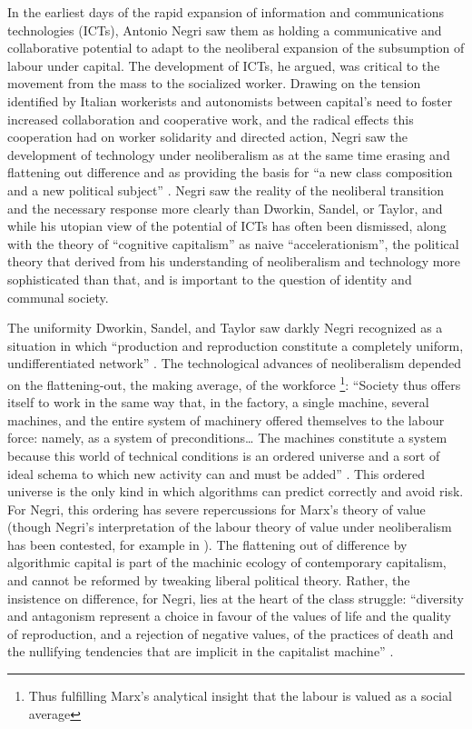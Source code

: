 \documentclass[12pt,oneside]{memoir}
\begin{document}
In the earliest days of the rapid expansion of information and communications technologies (ICTs), Antonio Negri saw them as holding a communicative and collaborative potential to adapt to the neoliberal expansion of the subsumption of labour under capital. The development of ICTs, he argued, was critical to the movement from the mass to the socialized worker. Drawing on the tension identified by Italian workerists and autonomists between capital's need to foster increased collaboration and cooperative work, and the radical effects this cooperation had on worker solidarity and directed action, Negri saw the development of technology under neoliberalism as at the same time erasing and flattening out difference and as providing the basis for ``a new class composition and a new political subject'' \citep[48]{Negri1989}. Negri saw the reality of the neoliberal transition and the necessary response more clearly than Dworkin, Sandel, or Taylor, and while his utopian view of the potential of ICTs has often been dismissed, along with the theory of ``cognitive capitalism'' as naive ``accelerationism'', the political theory that derived from his understanding of neoliberalism and technology more sophisticated than that, and is important to the question of identity and communal society. 
	
The uniformity Dworkin, Sandel, and Taylor saw darkly Negri recognized as a situation in which ``production and reproduction constitute a completely uniform, undifferentiated network'' \citep[89]{Negri1989}. The technological advances of neoliberalism depended on the flattening-out, the making average, of the workforce \footnote{Thus fulfilling Marx's analytical insight that the labour is valued as a social average}: ``Society thus offers itself to work in the same way that, in the factory, a single machine, several machines, and the entire system of machinery offered themselves to the labour force: namely, as a system of preconditions{\ldots} The machines constitute a system because this world of technical conditions is an ordered universe and a sort of ideal schema to which new activity can and must be added'' \citep[90]{Negri1989}. This ordered universe is the only kind in which algorithms can predict correctly and avoid risk. For Negri, this ordering has severe repercussions for Marx's theory of value (though Negri's interpretation of the labour theory of value under neoliberalism has been contested, for example in \cite{caffentzis-letters}). The flattening out of difference by algorithmic capital is part of the machinic ecology of contemporary capitalism, and cannot be reformed by tweaking liberal political theory. Rather, the insistence on difference, for Negri, lies at the heart of the class struggle: ``diversity and antagonism represent a choice in favour of the values of life and the quality of reproduction, and a rejection of negative values, of the practices of death and the nullifying tendencies that are implicit in the capitalist machine'' \citep[94]{Negri1989}.
	
\end{document}
